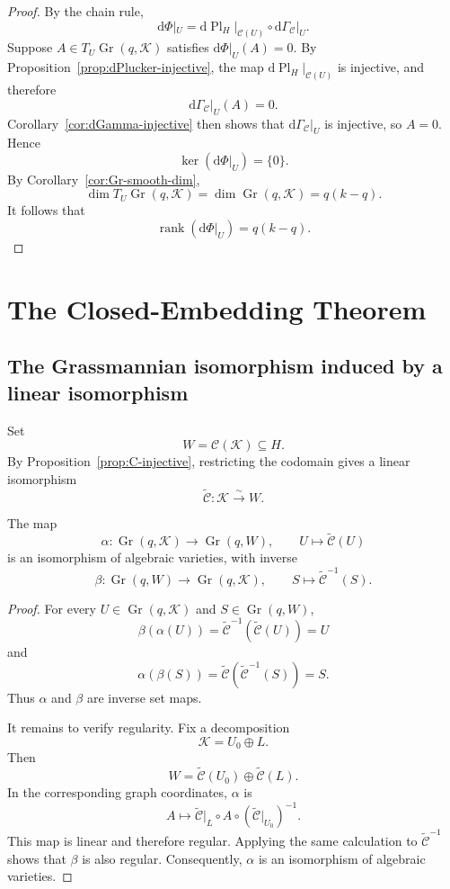 \documentclass{siamonline250211}
\newcommand{\Gr}{\operatorname{Gr}}
\newcommand{\Pl}{\operatorname{Pl}}
\newcommand{\rank}{\operatorname{rank}}
\newcommand{\cK}{\mathcal K}
\newcommand{\cC}{\mathcal C}
\newcommand{\dd}{\mathrm d}
\begin{document}
\begin{proof}
By the chain rule,
\[
  \dd\Phi|_U
  =\dd\Pl_H|_{\cC(U)}\circ\dd\Gamma_{\cC}|_U.
\]
Suppose $A\in T_U\Gr(q,\cK)$ satisfies $\dd\Phi|_U(A)=0$. By
Proposition~\ref{prop:dPlucker-injective}, the map
$\dd\Pl_H|_{\cC(U)}$ is injective, and therefore
\[
  \dd\Gamma_{\cC}|_U(A)=0.
\]
Corollary~\ref{cor:dGamma-injective} then shows that
$\dd\Gamma_{\cC}|_U$ is injective, so $A=0$. Hence
\[
  \ker(\dd\Phi|_U)=\{0\}.
\]
By Corollary~\ref{cor:Gr-smooth-dim},
\[
  \dim T_U\Gr(q,\cK)=\dim\Gr(q,\cK)=q(k-q).
\]
It follows that
\[
  \rank(\dd\Phi|_U)=q(k-q).
\]
\end{proof}

\section{The Closed-Embedding Theorem}

\subsection{The Grassmannian isomorphism induced by a linear isomorphism}

Set
\begin{equation}\label{eq:W}
  W=\cC(\cK)\subseteq H.
\end{equation}
By Proposition~\ref{prop:C-injective}, restricting the codomain gives a linear
isomorphism
\[
  \widetilde{\cC}:\cK\xrightarrow{\sim}W.
\]

\begin{lemma}\label{lem:alpha-isomorphism}
The map
\[
  \alpha:\Gr(q,\cK)\longrightarrow\Gr(q,W),
  \qquad U\longmapsto\widetilde{\cC}(U)
\]
is an isomorphism of algebraic varieties, with inverse
\[
  \beta:\Gr(q,W)\longrightarrow\Gr(q,\cK),
  \qquad S\longmapsto\widetilde{\cC}^{-1}(S).
\]
\end{lemma}

\begin{proof}
For every $U\in\Gr(q,\cK)$ and $S\in\Gr(q,W)$,
\[
  \beta(\alpha(U))
  =\widetilde{\cC}^{-1}(\widetilde{\cC}(U))=U
\]
and
\[
  \alpha(\beta(S))
  =\widetilde{\cC}(\widetilde{\cC}^{-1}(S))=S.
\]
Thus $\alpha$ and $\beta$ are inverse set maps.

It remains to verify regularity. Fix a decomposition
\[
  \cK=U_0\oplus L.
\]
Then
\[
  W=\widetilde{\cC}(U_0)\oplus\widetilde{\cC}(L).
\]
In the corresponding graph coordinates, $\alpha$ is
\[
  A\longmapsto
  \widetilde{\cC}|_L\circ A\circ
  (\widetilde{\cC}|_{U_0})^{-1}.
\]
This map is linear and therefore regular. Applying the same calculation to
$\widetilde{\cC}^{-1}$ shows that $\beta$ is also regular. Consequently,
$\alpha$ is an isomorphism of algebraic varieties.
\end{proof}
\end{document}
